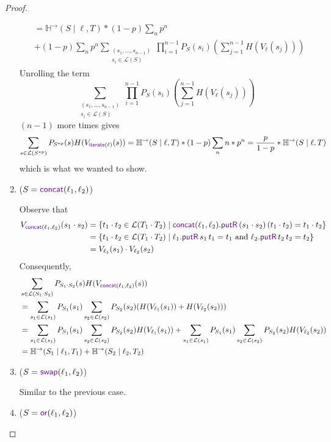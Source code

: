 \documentclass[acmsmall,screen,anonymous]{acmart}
\begin{document}
\begin{proof}
\begin{enumerate}
\begin{align*}
&= \mathbb{H}^{\rightarrow}(S \; | \; \ell, T) * (1-p)\sum_n p^n \\
&+(1-p)\sum_n p^n \sum_{\substack{(s_1, \ldots, s_{n-1}) \\ s_i \in \mathcal{L}(S)}} \prod_{i=1}^{n-1}P_S(s_i) \left(\sum_{j=1}^{n-1}H(V_{\ell}(s_j))\right)
\end{align*}
Unrolling the term 
$$\sum_{\substack{(s_1, \ldots, s_{n-1}) \\ s_i \in \mathcal{L}(S)}} \prod_{i=1}^{n-1}P_S(s_i) \left(\sum_{j=1}^{n-1}H(V_{\ell}(s_j))\right)$$ 
$(n-1)$ more times gives
$$\sum_{s \in \mathcal{L}(S^{*p})}P_{S^{*p}}(s) H(V_{\IterateLensOf{\Lens}}(s))
= \mathbb{H}^{\rightarrow}(S \; | \; \ell, T) * (1-p)\sum_n n * p^n  = \frac{p}{1-p} * \mathbb{H}^{\rightarrow}(S \; | \; \ell, T)$$
which is what we wanted to show.
\item
($S = \ConcatLensOf{\Lens_1}{\Lens_2}$)

Observe that 
\begin{align*}
V_{ \ConcatLensOf{\Lens_1}{\Lens_2}}(s_1 \cdot s_2) &= \{t_1 \cdot t_2 \in \mathcal{L}(T_1 \cdot T_2) \; | \;  \ConcatLensOf{\Lens_1}{\Lens_2}.\PutROf{(s_1 \cdot s_2)}{(t_1 \cdot t_2)} = t_1 \cdot t_2\}\\
&= \{t_1 \cdot t_2 \in \mathcal{L}(T_1 \cdot T_2) \; | \;  \ell_1.\PutROf{s_1}{t_1 } = t_1  \text{ and } \ell_2.\PutROf{t_2}{t_2} = t_2\}\\
&= V_{\ell_1}(s_1) \cdot V_{\ell_2}(s_2)
\end{align*}
Consequently,
\begin{align*}
&\sum_{s \in \mathcal{L}(S_1 \cdot S_2)}P_{S_1 \cdot S_2}(s) H(V_{\ConcatLensOf{\Lens_1}{\Lens_2}}(s))\\
&= \sum_{s_1 \in \mathcal{L}(s_1)} P_{S_1}(s_1)\sum_{s_2 \in \mathcal{L}(s_2)}P_{S_2}(s_2)(H(V_{\ell_1}(s_1)) + H(V_{\ell_2}(s_2)))\\
&= \sum_{s_1 \in \mathcal{L}(s_1)} P_{S_1}(s_1)\sum_{s_2 \in \mathcal{L}(s_2)}P_{S_2}(s_2)H(V_{\ell_1}(s_1)) + \sum_{s_1 \in \mathcal{L}(s_1)} P_{S_1}(s_1)\sum_{s_2 \in \mathcal{L}(s_2)}P_{S_2}(s_2)H(V_{\ell_2}(s_2))\\
&= \mathbb{H}^{\rightarrow}(S_1 \; | \; \ell_1, T_1) + \mathbb{H}^{\rightarrow}(S_2 \; | \; \ell_2, T_2)
\end{align*}
\item
($S = \SwapLensOf{\Lens_1}{\Lens_2}$)

Similar to the previous case.
\item
($S = \OrLensOf{\Lens_1}{\Lens_2}$)


\end{enumerate}
\end{proof}
\end{document}
